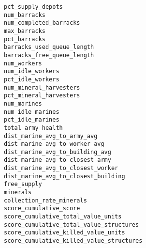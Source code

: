 \begin{description}
    \item[\texttt{pct\_supply\_depots}] 
    \item[\texttt{num\_barracks}] 
    \item[\texttt{num\_completed\_barracks}] 
    \item[\texttt{max\_barracks}] 
    \item[\texttt{pct\_barracks}] 
    \item[\texttt{barracks\_used\_queue\_length}] 
    \item[\texttt{barracks\_free\_queue\_length}] 
    \item[\texttt{num\_workers}] 
    \item[\texttt{num\_idle\_workers}] 
    \item[\texttt{pct\_idle\_workers}] 
    \item[\texttt{num\_mineral\_harvesters}] 
    \item[\texttt{pct\_mineral\_harvesters}] 
    \item[\texttt{num\_marines}] 
    \item[\texttt{num\_idle\_marines}] 
    \item[\texttt{pct\_idle\_marines}] 
    \item[\texttt{total\_army\_health}] 
    \item[\texttt{dist\_marine\_avg\_to\_army\_avg}] 
    \item[\texttt{dist\_marine\_avg\_to\_worker\_avg}] 
    \item[\texttt{dist\_marine\_avg\_to\_building\_avg}] 
    \item[\texttt{dist\_marine\_avg\_to\_closest\_army}] 
    \item[\texttt{dist\_marine\_avg\_to\_closest\_worker}] 
    \item[\texttt{dist\_marine\_avg\_to\_closest\_building}] 
    \item[\texttt{free\_supply}] 
    \item[\texttt{minerals}] 
    \item[\texttt{collection\_rate\_minerals}] 
    \item[\texttt{score\_cumulative\_score}] 
    \item[\texttt{score\_cumulative\_total\_value\_units}] 
    \item[\texttt{score\_cumulative\_total\_value\_structures}] 
    \item[\texttt{score\_cumulative\_killed\_value\_units}] 
    \item[\texttt{score\_cumulative\_killed\_value\_structures}] 

\end{description}
